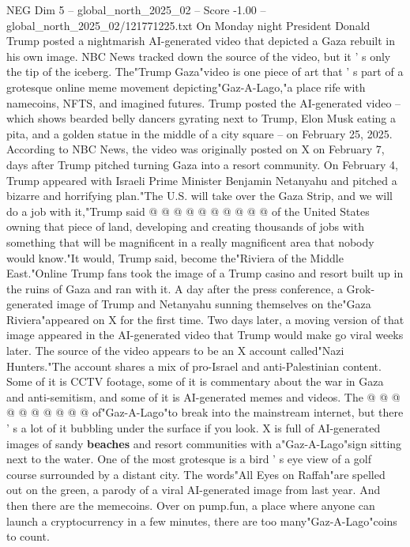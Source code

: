 \begin{textsample}{NEG Dim 5 – global\_north\_2025\_02 – Score -1.00 – global\_north\_2025\_02/121771225.txt}  \label{ex:f5_neg_125}
On Monday night President Donald Trump posted a nightmarish AI-generated video that depicted a Gaza rebuilt in his own image.
NBC News tracked down the source of the video, but it ' s only the tip of the iceberg.
The"Trump Gaza"video is one piece of art that ' s part of a grotesque online meme movement depicting"Gaz-A-Lago,"a place rife with namecoins, NFTS, and imagined futures.
Trump posted the AI-generated video -- which shows bearded belly dancers gyrating next to Trump, Elon Musk eating a pita, and a golden statue in the middle of a city square -- on February 25, 2025.
According to NBC News, the video was originally posted on X on February 7, days after Trump pitched turning Gaza into a resort community.
On February 4, Trump appeared with Israeli Prime Minister Benjamin Netanyahu and pitched a bizarre and horrifying plan."The U.S. will take over the Gaza Strip, and we will do a job with it,"Trump said @ @ @ @ @ @ @ @ @ @ of the United States owning that piece of land, developing and creating thousands of jobs with something that will be magnificent in a really magnificent area that nobody would know."It would, Trump said, become the"Riviera of the Middle East."Online Trump fans took the image of a Trump casino and resort built up in the ruins of Gaza and ran with it.
A day after the press conference, a Grok-generated image of Trump and Netanyahu sunning themselves on the"Gaza Riviera"appeared on X for the first time.
Two days later, a moving version of that image appeared in the AI-generated video that Trump would make go viral weeks later.
The source of the video appears to be an X account called"Nazi Hunters."The account shares a mix of pro-Israel and anti-Palestinian content.
Some of it is CCTV footage, some of it is commentary about the war in Gaza and anti-semitism, and some of it is AI-generated memes and videos.
The @ @ @ @ @ @ @ @ @ @ of"Gaz-A-Lago"to break into the mainstream internet, but there ' s a lot of it bubbling under the surface if you look.
X is full of AI-generated images of sandy \textbf{beaches} and resort communities with a"Gaz-A-Lago"sign sitting next to the water.
One of the most grotesque is a bird ' s eye view of a golf course surrounded by a distant city.
The words"All Eyes on Raffah"are spelled out on the green, a parody of a viral AI-generated image from last year.
And then there are the memecoins.
Over on pump.fun, a place where anyone can launch a cryptocurrency in a few minutes, there are too many"Gaz-A-Lago"coins to count.

\end{textsample}
